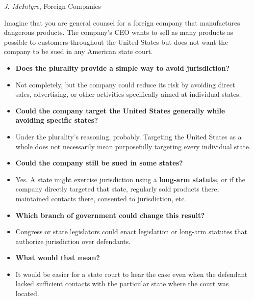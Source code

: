 \documentclass[11pt]{tex/lawoutline}
\begin{document}
\maketitle
\tableofcontents


\question
{\textit{J. McIntyre}, Foreign Companies}
{
    Imagine that you are general counsel for a foreign company that manufactures dangerous products. The company's CEO wants to sell as many products as possible to customers throughout the United States but does not want the company to be sued in any American state court.

    \begin{itemize}
    \item \textbf{Does the plurality provide a simple way to avoid jurisdiction?}
    \item Not completely, but the company could reduce its risk by avoiding direct sales, advertising, or other activities specifically aimed at individual states.

    \item \textbf{Could the company target the United States generally while avoiding specific states?}
    \item Under the plurality's reasoning, probably. Targeting the United States as a whole does not necessarily mean purposefully targeting every individual state.

    \item \textbf{Could the company still be sued in some states?}
    \item Yes. A state might exercise jurisdiction using a \textbf{long-arm statute}, or if the company directly targeted that state, regularly sold products there, maintained contacts there, consented to jurisdiction, etc.

    \item \textbf{Which branch of government could change this result?}
    \item Congress or state legislators could enact legislation or long-arm statutes that authorize jurisdiction over defendants.

    \item \textbf{What would that mean?}
    \item It would be easier for a state court to hear the case even when the defendant lacked sufficient contacts with the particular state where the court was located.
\end{itemize}
}
\end{document}
